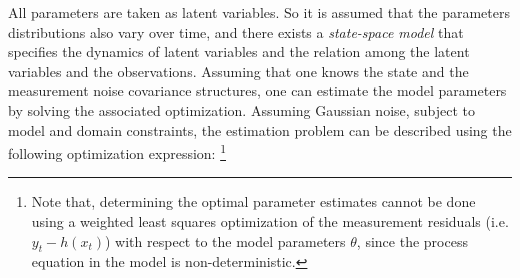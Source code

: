    All parameters are taken as latent variables. So it is assumed that the parameters distributions also vary over time, and there exists a \textit{state-space model} that specifies the dynamics of latent variables and the relation among the latent variables and the observations. 
Assuming that one knows the state and the measurement noise covariance structures, one can estimate the model parameters by solving the associated optimization. 
Assuming Gaussian noise, subject to model and domain constraints, the estimation problem can be described using the following optimization expression:  
  \footnote{Note that, determining the optimal parameter estimates cannot be done using a weighted least squares optimization of the measurement residuals (i.e. $y_t - h(x_t)$) with respect to the model parameters $\theta$, since the process equation in the model is non-deterministic.} 
  
  
  

